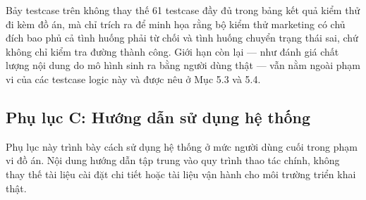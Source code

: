\documentclass[a4paper]{article}
\renewcommand{\arraystretch}{1.25}
\begin{document}
\renewcommand{\arraystretch}{1}

Bảy testcase trên không thay thế 61 testcase đầy đủ trong bảng kết quả kiểm thử đi kèm đồ án, mà chỉ trích ra để minh họa rằng bộ kiểm thử marketing có chủ đích bao phủ cả tình huống phải từ chối và tình huống chuyển trạng thái sai, chứ không chỉ kiểm tra đường thành công. Giới hạn còn lại — như đánh giá chất lượng nội dung do mô hình sinh ra bằng người dùng thật — vẫn nằm ngoài phạm vi của các testcase logic này và được nêu ở Mục 5.3 và 5.4.

\subsection*{Phụ lục C: Hướng dẫn sử dụng hệ thống}

Phụ lục này trình bày cách sử dụng hệ thống ở mức người dùng cuối trong phạm vi đồ án. Nội dung hướng dẫn tập trung vào quy trình thao tác chính, không thay thế tài liệu cài đặt chi tiết hoặc tài liệu vận hành cho môi trường triển khai thật.
\end{document}
